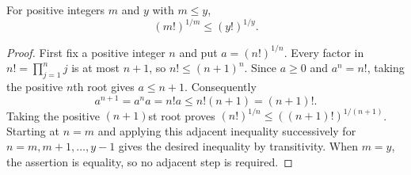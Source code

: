 \begin{lemma}
For positive integers $m$ and $y$ with $m\le y$,
\[
 (m!)^{1/m}\le (y!)^{1/y}.
\]
\end{lemma}
\begin{proof}
First fix a positive integer $n$ and put $a=(n!)^{1/n}$.
Every factor in $n!=\prod_{j=1}^n j$ is at most $n+1$, so
$n!\le(n+1)^n$. Since $a\ge0$ and $a^n=n!$, taking the
positive $n$th root gives $a\le n+1$. Consequently
\[
 a^{n+1}=a^n a=n!a\le n!(n+1)=(n+1)!.
\]
Taking the positive $(n+1)$st root proves
$(n!)^{1/n}\le((n+1)!)^{1/(n+1)}$.
Starting at $n=m$ and applying this adjacent inequality successively
for $n=m,m+1,\ldots,y-1$ gives the desired inequality by transitivity.
When $m=y$, the assertion is equality, so no adjacent step is required.
\end{proof}
